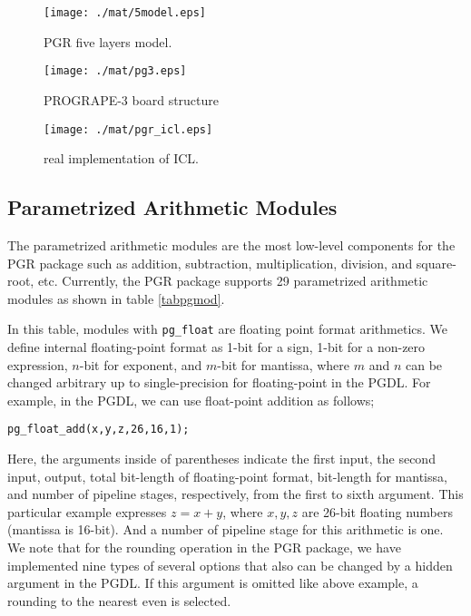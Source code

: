 \documentclass{llncs}
\begin{document}
\begin{figure}[htb]
\begin{center}
  \begin{minipage}{.45\linewidth}
    \begin{center}
    \texttt{[image: ./mat/5model.eps]}
    \caption{PGR five layers model.}
    \label{fig5model}
    \end{center}
  \end{minipage}
  \hspace{2.4pc}
  \begin{minipage}{.45\linewidth}
    \begin{center}
    \texttt{[image: ./mat/pg3.eps]}
    \caption{PROGRAPE-3 board structure}
    \end{center}
  \end{minipage}
\end{center}
\end{figure}



\begin{figure}[htb]
\begin{center}
\texttt{[image: ./mat/pgr\_icl.eps]}
\caption{real implementation of ICL.}
\label{figicl}
\end{center}
\end{figure}

\subsection{Parametrized Arithmetic Modules}
The parametrized arithmetic modules are the most low-level components
for the PGR package such as addition, subtraction, 
multiplication, division, and square-root, etc. 
Currently, the PGR package supports
29 parametrized arithmetic modules as shown in table \ref{tabpgmod}.

In this table, modules with {\tt pg\_float} are floating point format arithmetics.
We define internal floating-point format as 1-bit for a sign, 
1-bit for a non-zero expression, $n$-bit for exponent, 
and $m$-bit for mantissa, where $m$ and $n$ can be 
changed arbitrary up to single-precision for floating-point in the PGDL.
For example, in the PGDL, we can use float-point addition
as follows;
\begin{verbatim}
pg_float_add(x,y,z,26,16,1);
\end{verbatim}
Here, the arguments inside of parentheses indicate
the first input, the second input, output, total bit-length
of floating-point format, bit-length for mantissa,
and number of pipeline stages, respectively,
from the first to sixth argument.
This particular example expresses 
$z = x + y$, where $x,y,z$ are 26-bit floating numbers (mantissa is 16-bit).
And a number of pipeline stage for this arithmetic is one.
We note that for the rounding operation in the PGR package,
we have implemented nine types of several options that
also can be changed by a hidden argument in the PGDL.
If this argument is omitted like above example, 
a rounding to the nearest even is selected.
\end{document}
